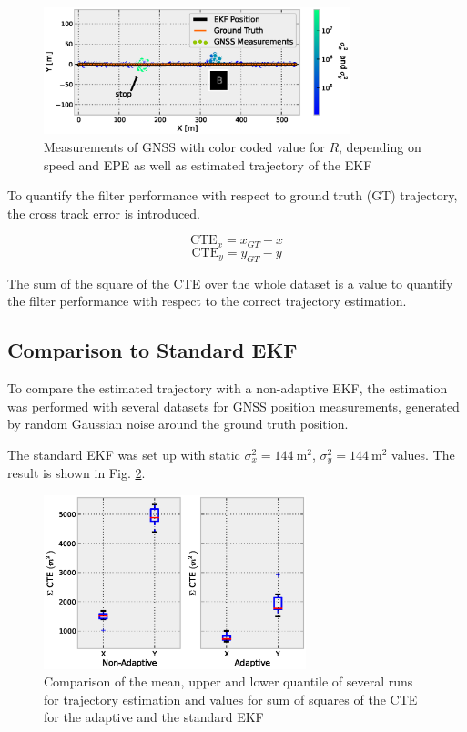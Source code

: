\documentclass[conference]{IEEEtran}
\begin{document}
\begin{figure}[ht]
\centering
\includegraphics[width=3.5in]{images/Extended-Kalman-Filter-CTRV-Position-Testdata}
\caption{Measurements of GNSS with color coded value for $R$, depending on speed and EPE as well as estimated trajectory of the EKF}
\label{CTRV-Position-Testdata}
\end{figure}

To quantify the filter performance with respect to ground truth (GT) trajectory, the cross track error is introduced.

\begin{equation}\text{CTE}_x=x_{GT}-x\end{equation}
\begin{equation}\text{CTE}_y=y_{GT}-y\end{equation}

The sum of the square of the CTE over the whole dataset is a value to quantify the filter performance with respect to the correct trajectory estimation.

\subsection{Comparison to Standard EKF}

To compare the estimated trajectory with a non-adaptive EKF, the estimation was performed with several datasets for GNSS position measurements, generated by random Gaussian noise around the ground truth position.

The standard EKF was set up with static $\sigma_x^2=\SI{144}{\square\metre}$, $\sigma_y^2=\SI{144}{\square\metre}$ values. The result is shown in Fig.  \ref{Boxplot}.

\begin{figure}[ht]
\centering
\includegraphics[width=3.0in]{images/CTE-Adaptive-NonAdaptive-Boxplot}
\caption{Comparison of the mean, upper and lower quantile of several runs for trajectory estimation and values for sum of squares of the CTE for the adaptive and the standard EKF}
\label{Boxplot}
\end{figure}
\end{document}
